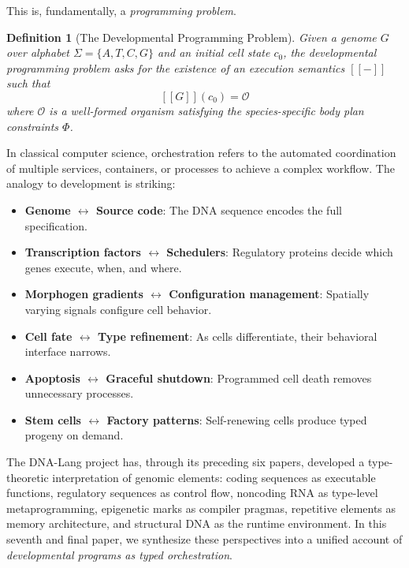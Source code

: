 \documentclass[12pt,a4paper]{article}
\newtheorem{definition}[theorem]{Definition}
\begin{document}
This is, fundamentally, a \emph{programming problem}.

\begin{definition}[The Developmental Programming Problem]\label{def:dev-problem}
Given a genome $G$ over alphabet $\Sigma = \{A,T,C,G\}$ and an initial
cell state $c_0$, the developmental programming problem asks for the
existence of an execution semantics $[\![ - ]\!]$ such that
\[
  [\![ G ]\!](c_0) = \mathcal{O}
\]
where $\mathcal{O}$ is a well-formed organism satisfying the species-specific
body plan constraints $\Phi$.
\end{definition}

In classical computer science, orchestration refers to the automated
coordination of multiple services, containers, or processes to achieve
a complex workflow.  The analogy to development is striking:

\begin{itemize}[leftmargin=2em]
  \item \textbf{Genome $\leftrightarrow$ Source code}: The DNA sequence
    encodes the full specification.
  \item \textbf{Transcription factors $\leftrightarrow$ Schedulers}: Regulatory
    proteins decide which genes execute, when, and where.
  \item \textbf{Morphogen gradients $\leftrightarrow$ Configuration management}:
    Spatially varying signals configure cell behavior.
  \item \textbf{Cell fate $\leftrightarrow$ Type refinement}: As cells
    differentiate, their behavioral interface narrows.
  \item \textbf{Apoptosis $\leftrightarrow$ Graceful shutdown}: Programmed
    cell death removes unnecessary processes.
  \item \textbf{Stem cells $\leftrightarrow$ Factory patterns}: Self-renewing
    cells produce typed progeny on demand.
\end{itemize}

The DNA-Lang project has, through its preceding six papers, developed a
type-theoretic interpretation of genomic elements: coding sequences as
executable functions, regulatory sequences as control flow, noncoding RNA
as type-level metaprogramming, epigenetic marks as compiler pragmas,
repetitive elements as memory architecture, and structural DNA as the
runtime environment.  In this seventh and final paper, we synthesize
these perspectives into a unified account of \emph{developmental programs
as typed orchestration}.
\end{document}

